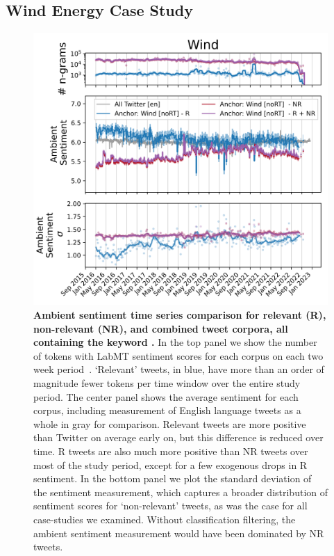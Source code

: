 \subsection{Wind Energy Case Study}
\begin{figure}[tp!]
  \centering	
    \includegraphics[width=0.98\columnwidth]{figures/Wind_sentiment_2016-01-01_2022-08-30.png}  
  \caption{
    \textbf{Ambient sentiment time series comparison for relevant  (R),
    non-relevant (NR), and combined tweet corpora,
    all containing the keyword .}
    In the top panel we show the number of tokens with LabMT
    sentiment scores for each corpus on each two week period~\cite{dodds2015human}.
    `Relevant' tweets, in blue, have more than an order of magnitude fewer tokens per time window over the entire study period.
    The center panel shows the average sentiment for each corpus, including measurement of English language tweets as a whole in gray for comparison. 
    Relevant  tweets are more positive than Twitter on average early on, but this difference is reduced over time.
    R tweets are also much more positive than NR tweets over most of the study period, except for a few exogenous drops in R sentiment.
    In the bottom panel we plot the standard deviation of the sentiment measurement,
    which captures a broader distribution of sentiment scores for  `non-relevant' tweets,
    as was the case for all case-studies we examined.
    Without classification filtering, the ambient sentiment measurement would have been dominated by NR tweets. 
  }
  \label{fig:wind_sentiment}
\end{figure}
